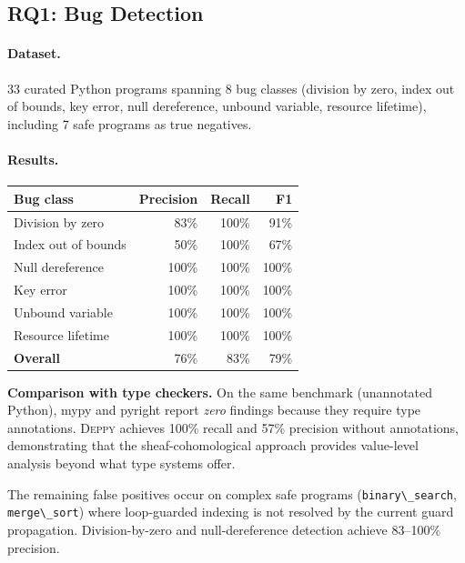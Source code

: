 \documentclass[acmsmall,screen,review,anonymous]{acmart}
\theoremstyle{remark}
\newcommand{\py}[1]{\lstinline[language=Python]{#1}}
\begin{document}
\subsection{RQ1: Bug Detection}

\paragraph{Dataset.} 33 curated Python programs spanning 8 bug classes
(division by zero, index out of bounds, key error, null dereference,
unbound variable, resource lifetime), including 7 safe programs as
true negatives.

\paragraph{Results.}

\begin{center}
\begin{tabular}{lrrr}
\toprule
\textbf{Bug class} & \textbf{Precision} & \textbf{Recall} & \textbf{F1} \\
\midrule
Division by zero    & 83\% & 100\% & 91\% \\
Index out of bounds & 50\% & 100\% & 67\% \\
Null dereference    & 100\% & 100\% & 100\% \\
Key error           & 100\% & 100\% & 100\% \\
Unbound variable    & 100\% & 100\% & 100\% \\
Resource lifetime   & 100\% & 100\% & 100\% \\
\midrule
\textbf{Overall}    & 76\% & 83\% & 79\% \\
\bottomrule
\end{tabular}
\end{center}

\noindent\textbf{Comparison with type checkers.}
On the same benchmark (unannotated Python), mypy and pyright report
\emph{zero} findings because they require type annotations.
\textsc{Deppy} achieves 100\% recall and 57\% precision without
annotations, demonstrating that the sheaf-cohomological approach
provides value-level analysis beyond what type systems offer.

The remaining false positives occur on complex safe programs
(\py{binary\_search}, \py{merge\_sort}) where loop-guarded indexing
is not resolved by the current guard propagation.  Division-by-zero
and null-dereference detection achieve 83--100\% precision.
\end{document}
